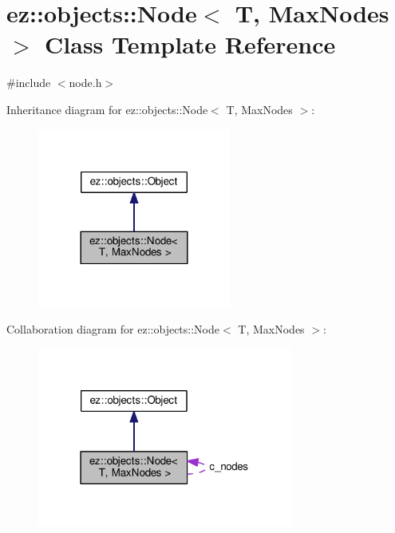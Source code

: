 \hypertarget{classez_1_1objects_1_1Node}{}\section{ez\+:\+:objects\+:\+:Node$<$ T, Max\+Nodes $>$ Class Template Reference}
\label{classez_1_1objects_1_1Node}


{\ttfamily \#include $<$node.\+h$>$}



Inheritance diagram for ez\+:\+:objects\+:\+:Node$<$ T, Max\+Nodes $>$\+:
\nopagebreak
\begin{figure}[H]
\begin{center}
\leavevmode
\includegraphics[width=180pt]{classez_1_1objects_1_1Node__inherit__graph}
\end{center}
\end{figure}


Collaboration diagram for ez\+:\+:objects\+:\+:Node$<$ T, Max\+Nodes $>$\+:
\nopagebreak
\begin{figure}[H]
\begin{center}
\leavevmode
\includegraphics[width=238pt]{classez_1_1objects_1_1Node__coll__graph}
\end{center}
\end{figure}
